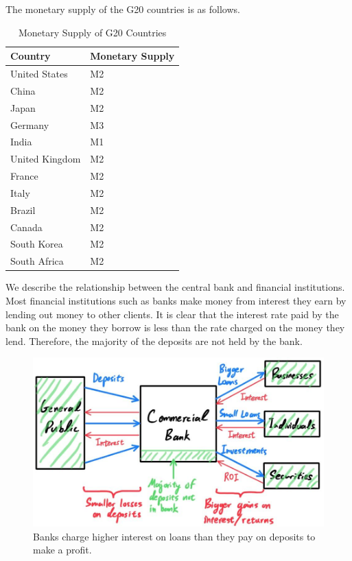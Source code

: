 \documentclass{article}
\begin{document}
    \begin{example}
      The monetary supply of the G20 countries is as follows. 
      \begin{table}[H]
        \centering
        \caption{Monetary Supply of G20 Countries}
        \label{table:monetary_supply}
        \begin{tabular}{@{}ll@{}}
        \toprule
        Country & Monetary Supply \\ \midrule
        United States & M2 \\
        China & M2 \\
        Japan & M2 \\
        Germany & M3 \\
        India & M1 \\
        United Kingdom & M2 \\
        France & M2 \\
        Italy & M2 \\
        Brazil & M2 \\
        Canada & M2 \\
        South Korea & M2 \\
        South Africa & M2 \\ \bottomrule
        \end{tabular}
      \end{table}
    \end{example}

    We describe the relationship between the central bank and financial institutions. Most financial institutions such as banks make money from interest they earn by lending out money to other clients. It is clear that the interest rate paid by the bank on the money they borrow is less than the rate charged on the money they lend. Therefore, the majority of the deposits are not held by the bank. 

    \begin{figure}[H]
      \centering 
      \includegraphics[scale=0.3]{img/Banks_Profit_on_Interest.jpg}
      \caption{Banks charge higher interest on loans than they pay on deposits to make a profit.}  
      \label{fig:Banks_Profit_on_Interest}
    \end{figure}
\end{document}
